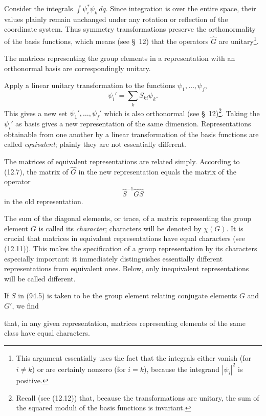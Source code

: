 Consider the integrals $\int\psi_i^*\psi_k\,dq$. Since integration is over the entire space, their values plainly remain unchanged under any rotation or reflection of the coordinate system. Thus symmetry transformations preserve the orthonormality of the basis functions, which means (see \S~12) that the operators $\widehat G$ are unitary\footnote{This argument essentially uses the fact that the integrals either vanish (for $i\ne k$) or are certainly nonzero (for $i=k$), because the integrand $|\psi_i|^2$ is positive.}.

The matrices representing the group elements in a representation with an orthonormal basis are correspondingly unitary.

Apply a linear unitary transformation to the functions $\psi_1,\ldots,\psi_f$,
\begin{equation}
 \psi_i'=\sum_kS_{ki}\psi_k.
 \tag{94.4}
\end{equation}
This gives a new set $\psi_1',\ldots,\psi_f'$ which is also orthonormal (see \S~12)\footnote{Recall (see (12.12)) that, because the transformations are unitary, the sum of the squared moduli of the basis functions is invariant.}. Taking the $\psi_i'$ as basis gives a new representation of the same dimension. Representations obtainable from one another by a linear transformation of the basis functions are called \emph{equivalent}; plainly they are not essentially different.

The matrices of equivalent representations are related simply. According to (12.7), the matrix of $\widehat G$ in the new representation equals the matrix of the operator
\begin{equation}
 \widehat{S}^{-1}\widehat G\widehat S
 \tag{94.5}
\end{equation}
in the old representation.

The sum of the diagonal elements, or trace, of a matrix representing the group element $G$ is called its \emph{character}; characters will be denoted by $\chi(G)$. It is crucial that matrices in equivalent representations have equal characters (see (12.11)). This makes the specification of a group representation by its characters especially important: it immediately distinguishes essentially different representations from equivalent ones. Below, only inequivalent representations will be called different.

If $S$ in (94.5) is taken to be the group element relating conjugate elements $G$ and $G'$, we find

that, in any given representation, matrices representing elements of the same class have equal characters.

